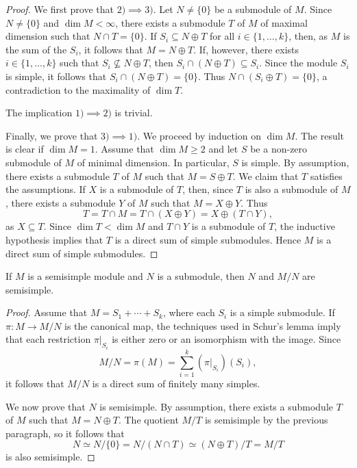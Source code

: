 \begin{proof}
	We first prove that $2)\implies3)$.
	Let $N\ne\{0\}$ be a submodule of $M$. Since $N\ne\{0\}$ and $\dim M<\infty$, there exists a submodule 
	$T$ of $M$ of maximal dimension such that 
	$N\cap T=\{0\}$. If $S_i\subseteq N\oplus T$ for all $i\in\{1,\dots,k\}$, then, as $M$ is the sum of the $S_i$, it follows that
	$M=N\oplus T$. 
	If, however, there exists $i\in\{1,\dots,k\}$ such that $S_i\not\subseteq N\oplus T$, then $S_i\cap (N\oplus T)\subseteq S_i$. 
	Since the module $S_i$ is simple,
	it follows that $S_i\cap (N\oplus T)=\{0\}$. Thus $N\cap (S_i\oplus T)=\{0\}$, a contradiction to the maximality of
	$\dim T$.  
	
	The implication  $1)\implies2)$ is trivial. 
	
	Finally, we prove that $3)\implies1)$. 
	We proceed by induction on $\dim M$. The result is clear if $\dim M=1$. Assume that $\dim M\geq2$ and   
	let $S$ be a non-zero submodule of $M$ of minimal dimension. In particular, $S$ is simple. 
    By assumption, there exists a submodule $T$ of $M$ such that $M=S\oplus T$. We claim that $T$ satisfies the assumptions. 
	If $X$ is a submodule of $T$, then, since $T$ is also a submodule of $M$, there exists a submodule $Y$ of $M$ such that 
	$M=X\oplus Y$. Thus  
	\[
	T=T\cap M=T\cap (X\oplus Y)=X\oplus (T\cap Y),
	\]
	as $X\subseteq T$. 
	Since $\dim T<\dim M$ and $T\cap Y$ is a submodule of $T$, the inductive hypothesis implies 
	that $T$ is a direct sum of simple submodules. Hence $M$ is a direct sum of simple submodules. 
\end{proof}

\begin{proposition}
    If $M$ is a semisimple module and $N$ is a submodule, then $N$ and $M/N$ are semisimple.	
\end{proposition}

\begin{proof}
	Assume that $M=S_1+\cdots+ S_k$, where each $S_i$ is a simple submodule. If $\pi\colon M\to M/N$ 
	is the canonical map, the techniques used in Schur's lemma imply that each restriction $\pi|_{S_i}$ 
	is either zero or an isomorphism with the image. Since  
	\[
	M/N=\pi(M)=\sum_{i=1}^k(\pi|_{S_i})(S_i),
	\]
	it follows that $M/N$ is a direct sum of finitely many simples. 
	
	We now prove that $N$ is semisimple. By assumption, 
	there exists a submodule $T$ of $M$ such that 
	$M=N\oplus T$. The quotient
	$M/T$ is semisimple by the previous paragraph, so it follows that 
	\[
	N\simeq N/\{0\}=N/(N\cap T)\simeq (N\oplus T)/T=M/T
	\]
	is also semisimple.     
\end{proof}

